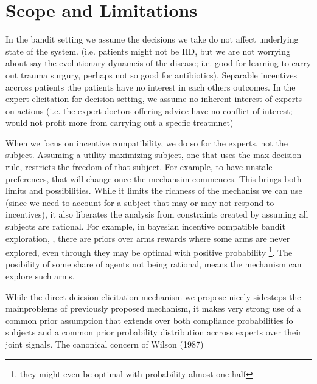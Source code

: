 \section{Scope and Limitations}

In the bandit setting we assume the decisions we take do not affect underlying state of the system. (i.e. patients might not be IID, but we are not worrying about say the evolutionary dynamcis of the disease; i.e. good for learning to carry out trauma surgury, perhaps not so good for antibiotics).  Separable incentives accross patients :the patients have no interest in each others outcomes. 
In the expert elicitation for decision setting, we assume no inherent interest of experts on actions (i.e. the expert doctors offering advice have no conflict of interest; would not profit more from carrying out a specfic treatmnet) 

When we focus on incentive compatibility, we do so for the experts, not the subject. Assuming a  utility maximizing subject, one that uses the max decision rule, restricts the freedom of that subject. For example, to have unstale preferences, that will change once the mechansim commences. This brings both limits and possibilities. While it limits the richness of the mechaniss we can use (since we need to account for a subject that may or may not respond to incentives), it also liberates the analysis from constraints created by assuming all subjects are rational. For example, in bayesian incentive compatible bandit exploration, \cite{mansour2015bayesian}, there are priors over arms rewards where some arms are never explored, even through they may be optimal with positive probability \footnote{they might even be optimal with probability almost one half}. The posibility of some share of agents not being rational, means the mechanism can explore such arms.



While the direct deicsion elicitation mechanism we propose nicely sidesteps the mainproblems of previously proposed mechanism, it makes very strong use of a common prior assumption that extends over both compliance probabilities fo subjects and a common prior probability distribution accross experts over their joint signals. The canonical concern of Wilson (1987) 


